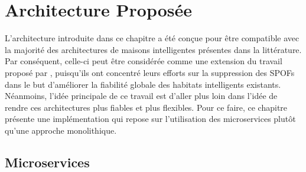 \section{Architecture Proposée}

L'architecture introduite dans ce chapitre a été conçue pour être compatible avec la majorité des architectures de maisons intelligentes présentes dans la littérature. Par conséquent, celle-ci peut être considérée comme une extension du travail proposé par \cite{Plantevin2018}, puisqu'ils ont concentré leurs efforts sur la suppression des \acsp{SPOF} dans le but d'améliorer la fiabilité globale des habitats intelligents existants. Néanmoins, l'idée principale de ce travail est d'aller plus loin dans l'idée de rendre ces architectures plus fiables et plus flexibles. Pour ce faire, ce chapitre présente une implémentation qui repose sur l'utilisation des microservices plutôt qu'une approche monolithique.

\subsection{Microservices}

